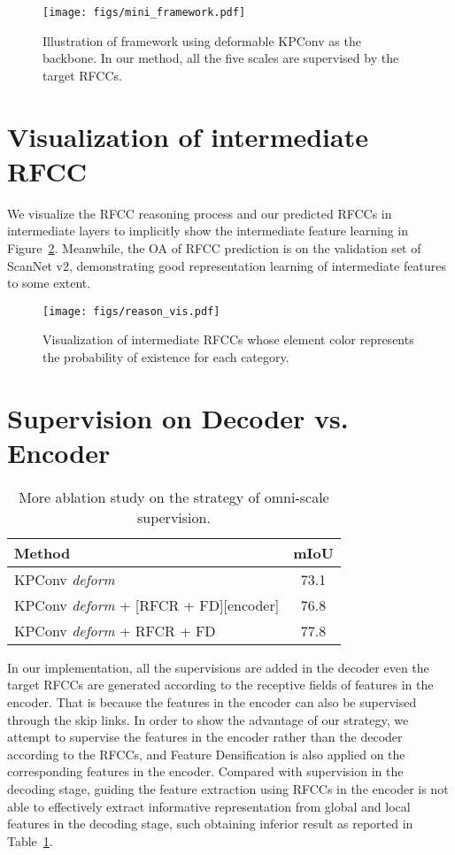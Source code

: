 \documentclass[final]{cvpr}
\begin{document}
\begin{figure}
    \centering
    \texttt{[image: figs/mini\_framework.pdf]}
    \caption{Illustration of framework using deformable KPConv as the backbone. In our method, all the five scales are supervised by the target RFCCs.}
    \label{fig:mini_framework}
\end{figure}

\section{Visualization of intermediate RFCC}
\label{sec:rfcc}
We visualize the RFCC reasoning process and our predicted RFCCs in intermediate layers to implicitly show the intermediate feature learning in Figure~\ref{fig:reason}. Meanwhile, the OA of RFCC prediction is  on the validation set of ScanNet v2, demonstrating good representation learning of intermediate features to some extent.
\begin{figure}[h!]
    \centering
    \texttt{[image: figs/reason\_vis.pdf]}
    \caption{Visualization of intermediate RFCCs whose element color represents the probability of existence for each category. }
    \label{fig:reason}
\end{figure}

\section{Supervision on Decoder vs. Encoder}
\label{sec:encoder}

\begin{table}[h]
    \centering
    \begin{tabular}{lc}
    \toprule
        Method &  mIoU\\
    \midrule
        KPConv \textit{deform} & 73.1\\
    \midrule
        KPConv \textit{deform} + [RFCR + FD][encoder] & 76.8\\
        KPConv \textit{deform} + RFCR + FD & 77.8\\
    \bottomrule
    \end{tabular}
    \caption{More ablation study on the strategy of omni-scale supervision.}
    \label{tab:encoder}
\end{table}



In our implementation, all the supervisions are added in the decoder even the target RFCCs are generated according to the receptive fields of features in the encoder. That is because the features in the encoder can also be supervised through the skip links. In order to show the advantage of our strategy, we attempt to supervise the features in the encoder rather than the decoder according to the RFCCs, and Feature Densification is also applied on the corresponding features in the encoder. Compared with supervision in the decoding stage, guiding the feature extraction using RFCCs in the encoder is not able to effectively extract informative representation from global and local features in the decoding stage, such obtaining inferior result as reported in Table~\ref{tab:encoder}. 
\end{document}
